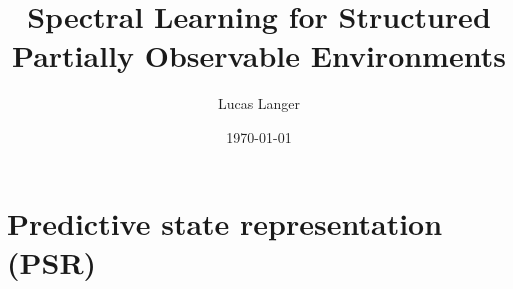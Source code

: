 \documentclass{beamer}
\title[Spectral learning with structure]{Spectral Learning for Structured Partially Observable Environments} %
\author{Lucas Langer} %
\institute[McGill University] %
{
Supervisors: Borja Balle, Doina Precup \\
\medskip
}
\date{\today} %
\begin{document}
\begin{frame}
\titlepage %
\end{frame}

\section{Predictive state representation (PSR)} %



\end{document}
